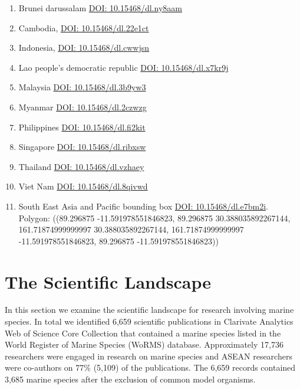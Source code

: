 \documentclass[openany]{book}
\providecommand{\tightlist}{%
  \setlength{\itemsep}{0pt}\setlength{\parskip}{0pt}}
\theoremstyle{definition}
\theoremstyle{definition}
\theoremstyle{definition}
\theoremstyle{remark}
\begin{document}
\begin{enumerate}
\def\labelenumi{\arabic{enumi}.}
\tightlist
\item
  Brunei darussalam
  \href{https://www.gbif.org/occurrence/download/0020859-180131172636756}{DOI:
  10.15468/dl.ny8aam}
\item
  Cambodia,
  \href{https://www.gbif.org/occurrence/download/0020860-180131172636756}{DOI:
  10.15468/dl.22e1ct}
\item
  Indonesia,
  \href{https://www.gbif.org/occurrence/download/0020862-180131172636756}{DOI:
  10.15468/dl.cwwjsn}
\item
  Lao people's democratic republic
  \href{https://www.gbif.org/occurrence/download/0020864-180131172636756}{DOI:
  10.15468/dl.x7kr9j}
\item
  Malaysia
  \href{https://www.gbif.org/occurrence/download/0020868-180131172636756}{DOI:
  10.15468/dl.3b9yw3}
\item
  Myanmar
  \href{https://www.gbif.org/occurrence/download/0020878-180131172636756}{DOI:
  10.15468/dl.2czwzg}
\item
  Philippines
  \href{https://www.gbif.org/occurrence/download/0020868-180131172636756}{DOI:
  10.15468/dl.fi2kit}
\item
  Singapore
  \href{https://www.gbif.org/occurrence/download/0020880-180131172636756}{DOI:
  10.15468/dl.ribxsw}
\item
  Thailand
  \href{https://www.gbif.org/occurrence/download/0020885-180131172636756}{DOI:
  10.15468/dl.vzhaey}
\item
  Viet Nam
  \href{https://www.gbif.org/occurrence/download/0020888-180131172636756}{DOI:
  10.15468/dl.8qivwd}
\item
  South East Asia and Pacific bounding box
  \href{https://www.gbif.org/occurrence/download/0000637-171219132708484}{DOI:
  10.15468/dl.e7bm2i}. Polygon: ((89.296875 -11.591978551846823,
  89.296875 30.388035892267144, 161.71874999999997 30.388035892267144,
  161.71874999999997 -11.591978551846823, 89.296875
  -11.591978551846823))
\end{enumerate}

\hypertarget{scientific}{%
\chapter{The Scientific Landscape}\label{scientific}}

In this section we examine the scientific landscape for research
involving marine species. In total we identified 6,659 scientific
publications in Clarivate Analytics Web of Science Core Collection that
contained a marine species listed in the World Register of Marine
Species (WoRMS) database. Approximately 17,736 researchers were engaged
in research on marine species and ASEAN researchers were co-authors on
77\% (5,109) of the publications. The 6,659 records contained 3,685
marine species after the exclusion of common model organisms.
\end{document}
